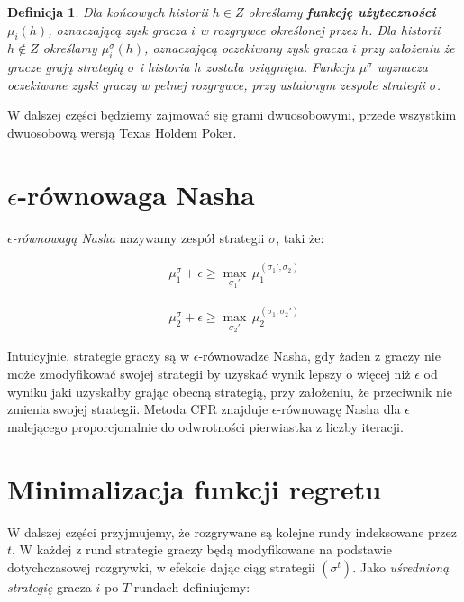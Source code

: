 \documentclass[magisterska]{pracamgr}
\newtheorem{definition}[theorem]{Definicja}
\begin{document}
\begin{definition}
      Dla końcowych historii $h \in Z$ określamy \textbf{funkcję użyteczności} $\mu_i(h)$, oznaczającą zysk gracza $i$ w rozgrywce
      określonej przez $h$. Dla historii $h \notin Z$ określamy $\mu_i^{\sigma}(h)$, oznaczającą oczekiwany zysk gracza $i$
      przy założeniu że gracze grają strategią $\sigma$ i historia $h$ została osiągnięta. Funkcja $\mu^{\sigma}$ wyznacza
      oczekiwane zyski graczy w pełnej rozgrywce, przy ustalonym zespole strategii $\sigma$.
\end{definition}

\noindent
W dalszej części będziemy zajmować się grami dwuosobowymi, przede wszystkim dwuosobową wersją Texas Holdem Poker.

\section{$\epsilon$-równowaga Nasha}

\emph{$\epsilon$-równowagą Nasha} nazywamy zespół strategii $\sigma$, taki że:

\begin{align*}
\mu_1^{\sigma} + \epsilon \geq  \max_{\sigma_1'} \, \mu_1^{(\sigma_1', \sigma_2)} 
\end{align*}

\begin{align*}
\mu_2^{\sigma} + \epsilon \geq  \max_{\sigma_2'} \, \mu_2^{(\sigma_1, \sigma_2')} 
\end{align*}

\noindent
Intuicyjnie, strategie graczy są w $\epsilon$-równowadze Nasha, gdy żaden z graczy nie może zmodyfikować swojej strategii
by uzyskać wynik lepszy o więcej niż $\epsilon$ od wyniku jaki uzyskałby grając obecną strategią, przy założeniu, że przeciwnik nie zmienia
swojej strategii.
Metoda CFR znajduje $\epsilon$-równowagę Nasha dla $\epsilon$ malejącego proporcjonalnie do odwrotności pierwiastka z liczby iteracji.

\section{Minimalizacja funkcji regretu}
\label{cfr-opis}

W dalszej części przyjmujemy, że rozgrywane są kolejne rundy indeksowane przez $t$. W każdej z rund
strategie graczy będą modyfikowane na podstawie dotychczasowej rozgrywki, w efekcie dając ciąg strategii
$(\sigma^t)$. Jako \emph{uśrednioną strategię} gracza $i$ po $T$ rundach definiujemy:
\end{document}
